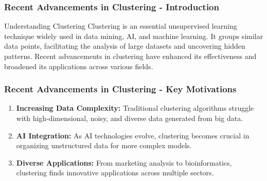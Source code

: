 \documentclass[aspectratio=169]{beamer}
\begin{document}
\begin{frame}[fragile]
    \frametitle{Recent Advancements in Clustering - Introduction}
    \begin{block}{Understanding Clustering}
        Clustering is an essential unsupervised learning technique widely used in data mining, AI, and machine learning. 
        It groups similar data points, facilitating the analysis of large datasets and uncovering hidden patterns.  
        Recent advancements in clustering have enhanced its effectiveness and broadened its applications across various fields.
    \end{block}
\end{frame}

\begin{frame}[fragile]
    \frametitle{Recent Advancements in Clustering - Key Motivations}
    \begin{enumerate}
        \item \textbf{Increasing Data Complexity:} Traditional clustering algorithms struggle with high-dimensional, noisy, and diverse data generated from big data.
        \item \textbf{AI Integration:} As AI technologies evolve, clustering becomes crucial in organizing unstructured data for more complex models.
        \item \textbf{Diverse Applications:} From marketing analysis to bioinformatics, clustering finds innovative applications across multiple sectors.
    \end{enumerate}
\end{frame}
\end{document}
